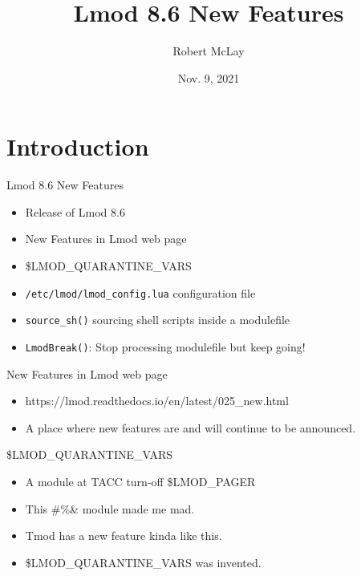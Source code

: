 \documentclass{beamer}
\begin{document}
\title[Lmod]{Lmod 8.6 New Features}
\author{Robert McLay} 
\date{Nov. 9, 2021}

\frame{\titlepage} 

\section{Introduction}

\begin{frame}{Lmod 8.6 New Features}
  \begin{itemize}
    \item Release of Lmod 8.6
    \item New Features in Lmod web page
    \item \$LMOD\_QUARANTINE\_VARS
    \item \texttt{/etc/lmod/lmod\_config.lua} configuration file
    \item \texttt{source\_sh()} sourcing shell scripts inside a
      modulefile
    \item \texttt{LmodBreak()}: Stop processing modulefile but keep
      going!
  \end{itemize}
\end{frame}

\begin{frame}{New Features in Lmod web page}
  \begin{itemize}
    \item https://lmod.readthedocs.io/en/latest/025\_new.html
    \item A place where new features are and will continue to be announced.
  \end{itemize}
\end{frame}

\begin{frame}{\$LMOD\_QUARANTINE\_VARS}
  \begin{itemize}
    \item A module at TACC turn-off  \$LMOD\_PAGER
    \item This \!\@\#\%\& module made me mad.
    \item Tmod has a new feature kinda like this.
    \item \$LMOD\_QUARANTINE\_VARS was invented.
  \end{itemize}
\end{frame}
\end{document}
